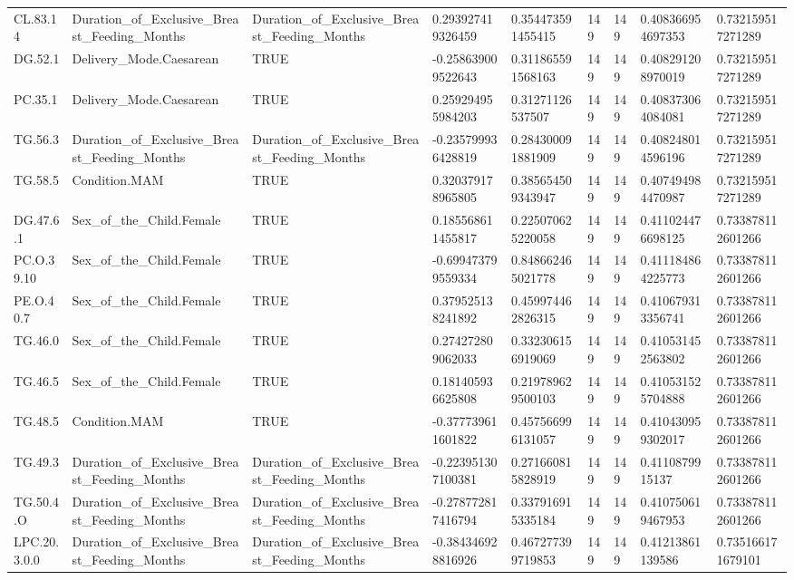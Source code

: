 \begin{longtable}{lllllllll}
CL.83.14 & Duration\_of\_Exclusive\_Breast\_Feeding\_Months & Duration\_of\_Exclusive\_Breast\_Feeding\_Months & 0.293927419326459 & 0.354473591455415 & 149 & 149 & 0.408366954697353 & 0.732159517271289 \\
DG.52.1 & Delivery\_Mode.Caesarean & TRUE & -0.258639009522643 & 0.311865591568163 & 149 & 149 & 0.408291208970019 & 0.732159517271289 \\
PC.35.1 & Delivery\_Mode.Caesarean & TRUE & 0.259294955984203 & 0.31271126537507 & 149 & 149 & 0.408373064084081 & 0.732159517271289 \\
TG.56.3 & Duration\_of\_Exclusive\_Breast\_Feeding\_Months & Duration\_of\_Exclusive\_Breast\_Feeding\_Months & -0.235799936428819 & 0.284300091881909 & 149 & 149 & 0.408248014596196 & 0.732159517271289 \\
TG.58.5 & Condition.MAM & TRUE & 0.320379178965805 & 0.385654509343947 & 149 & 149 & 0.407494984470987 & 0.732159517271289 \\
DG.47.6.1 & Sex\_of\_the\_Child.Female & TRUE & 0.185568611455817 & 0.225070625220058 & 149 & 149 & 0.411024476698125 & 0.733878112601266 \\
PC.O.39.10 & Sex\_of\_the\_Child.Female & TRUE & -0.699473799559334 & 0.848662465021778 & 149 & 149 & 0.411184864225773 & 0.733878112601266 \\
PE.O.40.7 & Sex\_of\_the\_Child.Female & TRUE & 0.379525138241892 & 0.459974462826315 & 149 & 149 & 0.410679313356741 & 0.733878112601266 \\
TG.46.0 & Sex\_of\_the\_Child.Female & TRUE & 0.274272809062033 & 0.332306156919069 & 149 & 149 & 0.410531452563802 & 0.733878112601266 \\
TG.46.5 & Sex\_of\_the\_Child.Female & TRUE & 0.181405936625808 & 0.219789629500103 & 149 & 149 & 0.410531525704888 & 0.733878112601266 \\
TG.48.5 & Condition.MAM & TRUE & -0.377739611601822 & 0.457566996131057 & 149 & 149 & 0.410430959302017 & 0.733878112601266 \\
TG.49.3 & Duration\_of\_Exclusive\_Breast\_Feeding\_Months & Duration\_of\_Exclusive\_Breast\_Feeding\_Months & -0.223951307100381 & 0.271660815828919 & 149 & 149 & 0.4110879915137 & 0.733878112601266 \\
TG.50.4.O & Duration\_of\_Exclusive\_Breast\_Feeding\_Months & Duration\_of\_Exclusive\_Breast\_Feeding\_Months & -0.278772817416794 & 0.337916915335184 & 149 & 149 & 0.410750619467953 & 0.733878112601266 \\
LPC.20.3.0.0 & Duration\_of\_Exclusive\_Breast\_Feeding\_Months & Duration\_of\_Exclusive\_Breast\_Feeding\_Months & -0.384346928816926 & 0.467277399719853 & 149 & 149 & 0.41213861139586 & 0.735166171679101 \\

\end{longtable}
